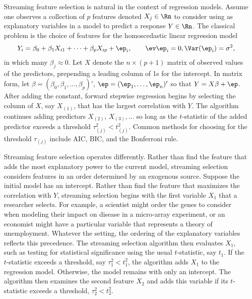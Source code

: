 \documentclass[12pt]{article}
\begin{document}
 Streaming feature selection is natural in the context of regression models.
  Assume one observes a collection of $p$ features denoted $X_j \in \Rn$ to
 consider using as explanatory variables in a model to predict a response $Y \in
 \Rn$.  The classical problem is the choice of features for the homoscedastic
 linear regression model
 \begin{equation}
   Y_i = \beta_0 + \beta_1 X_{i1} + \cdots + \beta_p X_{ip} + \ep_i, 
     \qquad \ev \ep_i = 0, \Var(\ep_i)=\sigma^2,
 \label{eq:regr}
 \end{equation}
 in which many $\beta_j \approx 0$. Let $X$ denote the $n\times (p+1)$ matrix of
 observed values of the predictors, prepending a leading column of 1s for the
 intercept.  In matrix form, let $\beta = (\beta_0, \beta_1, \ldots, \beta_p)'$,
 $\ep = (\ep_1,\ldots,\ep_n)'$ so that $Y = X\beta + \ep$.  After adding the
 constant, forward stepwise regression begins by selecting the column of $X$,
 say $X_{(1)}$, that has the largest correlation with $Y$.  The algorithm
 continues adding predictors $X_{(2)},\, X_{(3)}, \ldots$ so long as the
 $t$-statistic of the added predictor exceeds a threshold $\tau_{(j)}^2 <
 t_{(j)}^2$.  Common methods for choosing for the threshold $\tau_{(j)}$ include
 AIC, BIC, and the Bonferroni rule.

 
 Streaming feature selection operates differently.  Rather than find the feature
 that adds the most explanatory power to the current model, streaming selection
 considers features in an order determined by an exogenous source.  Suppose the
 initial model has an intercept.  Rather than find the feature that maximizes
 the correlation with $Y$, streaming selection begins with the first variable
 $X_1$ that a researcher selects.  For example, a scientist might order the
 genes to consider when modeling their impact on disease in a micro-array
 experiment, or an economist might have a particular variable that represents a
 theory of unemployment.  Whatever the setting, the ordering of the explanatory
 variables reflects this precedence.  The streaming selection algorithm then
 evaluates $X_1$, such as testing for statistical significance using the usual
 $t$-statistic, say $t_1$.  If the $t$-statistic exceeds a threshold, say
 $\tau_1^2 < t_1^2$, the algorithm adds $X_1$ to the regression model.
  Otherwise, the model remains with only an intercept.  The algorithm then
 examines the second feature $X_2$ and adds this variable if its $t$-statistic
 exceeds a threshold, $\tau_2^2 < t_2^2$.  
\end{document}
